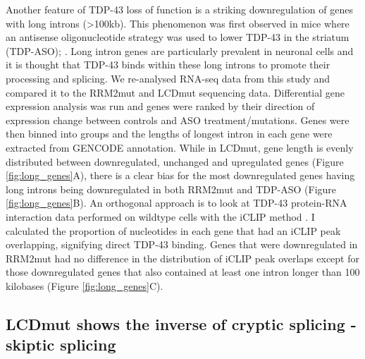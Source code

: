 Another feature of TDP-43 loss of function is a striking downregulation of genes with long introns (>100kb). This phenomenon was first observed in mice where an antisense oligonucleotide strategy was used to lower TDP-43 in the striatum (TDP-ASO); \citep{Polymenidou2011-hs}. Long intron genes are particularly prevalent in neuronal cells and it is thought that TDP-43 binds within these long introns to promote their processing and splicing. We re-analysed RNA-seq data from this study and compared it to the RRM2mut and LCDmut sequencing data. Differential gene expression analysis was run and genes were ranked by their direction of expression change between controls and ASO treatment/mutations. Genes were then binned into groups and the lengths of longest intron in each gene were extracted from GENCODE annotation. While in LCDmut, gene length is evenly distributed between downregulated, unchanged and upregulated genes (Figure \ref{fig:long_genes}A), there is a clear bias for the most downregulated genes having long introns being downregulated in both RRM2mut and TDP-ASO (Figure \ref{fig:long_genes}B). 
An orthogonal approach is to look at TDP-43 protein-RNA interaction data performed on wildtype cells with the iCLIP method \citep{Huppertz2014-ip}. I calculated the proportion of nucleotides in each gene that had an iCLIP peak overlapping, signifying direct TDP-43 binding. Genes that were downregulated in RRM2mut had no difference in the distribution of iCLIP peak overlaps except for those downregulated genes that also contained at least one intron longer than 100 kilobases (Figure \ref{fig:long_genes}C). 


\subsection{LCDmut shows the inverse of cryptic splicing - skiptic splicing}

